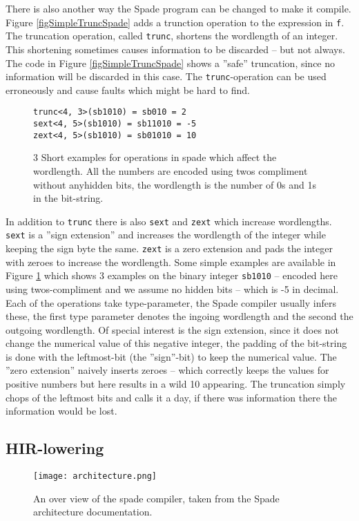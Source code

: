There is also another way the Spade program can be changed to make it compile. Figure \ref{figSimpleTruncSpade} adds a trunction operation to the expression in \verb+f+. The truncation operation, called \verb+trunc+, shortens the wordlength of an integer. This shortening sometimes causes information to be discarded -- but not always. The code in Figure \ref{figSimpleTruncSpade} shows a ''safe'' truncation, since no information will be discarded in this case. The \verb+trunc+-operation can be used erroneously and cause faults which might be hard to find.

\begin{figure}
\centering
\begin{verbatim}
trunc<4, 3>(sb1010) = sb010 = 2
sext<4, 5>(sb1010) = sb11010 = -5
zext<4, 5>(sb1010) = sb01010 = 10
\end{verbatim}
  \caption{3 Short examples for operations in spade which affect the wordlength. All the numbers are encoded using twos compliment without anyhidden bits, the wordlength is the number of 0s and 1s in the bit-string.}
\label{figSext}
\end{figure}

In addition to \verb+trunc+ there is also \verb+sext+ and \verb+zext+ which increase wordlengths. \verb+sext+ is a ''sign extension'' and increases the wordlength of the integer while keeping the sign byte the same. \verb+zext+ is a zero extension and pads the integer with zeroes to increase the wordlength. Some simple examples are available in Figure \ref{figSext} which shows 3 examples on the binary integer \verb+sb1010+ -- encoded here using twos-compliment and we assume no hidden bits --  which is -5 in decimal. Each of the operations take type-parameter, the Spade compiler usually infers these, the first type parameter denotes the ingoing wordlength and the second the outgoing wordlength. Of special interest is the sign extension, since it does not change the numerical value of this negative integer, the padding of the bit-string is done with the leftmost-bit (the ''sign''-bit) to keep the numerical value. The ''zero extension'' naively inserts zeroes -- which correctly keeps the values for positive numbers but here results in a wild 10 appearing. The truncation simply chops of the leftmost bits and calls it a day, if there was information there the information would be lost.

\subsection{HIR-lowering}
\begin{figure}
  \texttt{[image: architecture.png]}
  \caption{An over view of the spade compiler, taken from the Spade architecture documentation\cite{src:Architecture}.}
  \label{figArch}
\end{figure}

